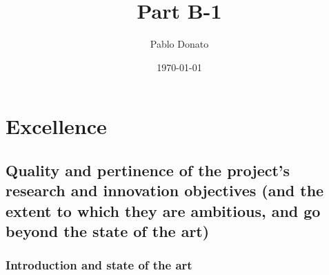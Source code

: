 \documentclass[12pt,draftproposal]{msca-pf}
\title{Part B-1}
\author{Pablo Donato}
\date{\today}
\begin{document}
\maketitle



\section{Excellence }
\label{sc:excellence}

\subsection{Quality and pertinence of the project's research and innovation objectives
    (and the extent to which they are ambitious, and go beyond the state of the art)}
\label{ssc:excellence:quality}

\subsubsection{Introduction and state of the art}
\end{document}
